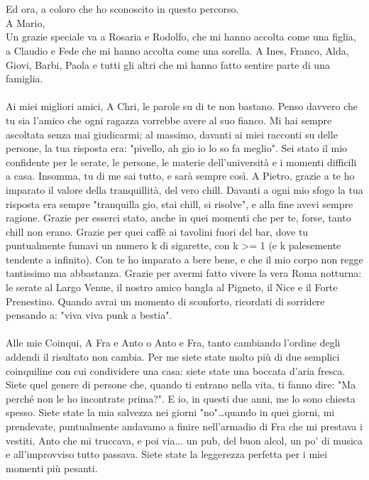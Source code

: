 \\\\
Ed ora, a coloro che ho sconoscito in questo percorso.
\\
A Mario,
\\
Un grazie speciale va a Rosaria e Rodolfo, che mi hanno accolta come una figlia, a Claudio e Fede che mi hanno accolta come una sorella. A Ines, Franco, Alda, Giovi, Barbi, Paola e tutti gli altri che mi hanno fatto sentire parte di una famiglia.
\\\\
Ai miei migliori amici, 
A Chri, le parole su di te non bastano. Penso davvero che tu sia l’amico che ogni ragazza vorrebbe avere al suo fianco. Mi hai sempre ascoltata senza mai giudicarmi; al massimo, davanti ai miei racconti su delle persone, la tua risposta era: "pivello, ah gio io lo so fa meglio". Sei stato il mio confidente per le serate, le persone, le materie dell'università e i momenti difficili a casa. Insomma, tu di me sai tutto, e sarà sempre così.
A Pietro, grazie a te ho imparato il valore della tranquillità, del vero chill. Davanti a ogni mio sfogo la tua risposta era sempre "tranquilla gio, stai chill, si risolve", e alla fine avevi sempre ragione. Grazie per esserci stato, anche in quei momenti che per te, forse, tanto chill non erano. Grazie per quei caffè ai tavolini fuori del bar, dove tu puntualmente fumavi un numero k di sigarette, con k >= 1 (e k palesemente tendente a infinito). Con te ho imparato a bere bene, e che il mio corpo non regge tantissimo ma abbastanza. Grazie per avermi fatto vivere la vera Roma notturna: le serate al Largo Venue, il nostro amico bangla al Pigneto, il Nice e il Forte Prenestino. Quando avrai un momento di sconforto, ricordati di sorridere pensando a: "viva viva punk a bestia".
\\\\
Alle mie Coinqui,
A Fra e Anto o Anto e Fra, tanto cambiando l'ordine degli addendi il risultato non cambia. Per me siete state molto più di due semplici coinquiline con cui condividere una casa: siete state una boccata d'aria fresca. Siete quel genere di persone che, quando ti entrano nella vita, ti fanno dire: "Ma perché non le ho incontrate prima?". E io, in questi due anni, me lo sono chiesta spesso. Siete state la mia salvezza nei giorni "no"…quando in quei giorni, mi prendevate, puntualmente andavamo a finire nell’armadio di Fra che mi prestava i vestiti, Anto che mi truccava, e poi via... un pub, del buon alcol, un po' di musica e all'improvviso tutto passava. Siete state la leggerezza perfetta per i miei momenti più pesanti.
